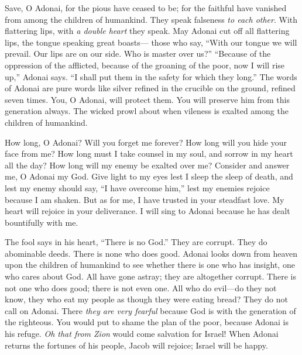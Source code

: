 \begin{biblechapter} %
 Save, O Adonai, for the pious have ceased to be; 
for the faithful have vanished 
from among the children of humankind.
\verse They speak falseness \textit{to each other}. 
With flattering lips, 
with \textit{a double heart} they speak.
\verse May Adonai cut off all flattering lips, 
the tongue speaking great boasts—
\verse those who say, “With our tongue we will prevail. 
Our lips are on our side. 
Who is master over us?”
\verse “Because of the oppression of the afflicted, 
because of the groaning of the poor, 
now I will rise up,” Adonai says. 
“I shall put them in the safety for which they long.”
\verse The words of Adonai are pure words 
like silver refined in the crucible on the ground, 
refined seven times.
\verse You, O Adonai, will protect them. 
You will preserve him 
from this generation always.
\verse The wicked prowl about 
when vileness is exalted among the children of humankind.
\end{biblechapter}

\begin{biblechapter} %
 How long, O Adonai? Will you forget me forever? 
How long will you hide your face from me?
\verse How long must I take counsel in my soul, 
and sorrow in my heart all the day? 
How long will my enemy be exalted over me?
\verse Consider and answer me, O Adonai my God. 
Give light to my eyes 
lest I sleep the sleep of death,
\verse and lest my enemy should say, “I have overcome him,” 
lest my enemies rejoice because I am shaken.
\verse But as for me, I have trusted in your steadfast love. 
My heart will rejoice in your deliverance.
\verse  I will sing to Adonai 
because he has dealt bountifully with me.
\end{biblechapter}

\begin{biblechapter} %
 The fool says in his heart, “There is no God.” 
They are corrupt. 
They do abominable deeds. 
There is none who does good.
\verse Adonai looks down from heaven upon the children of humankind 
to see whether there is one who has insight, 
one who cares about God.
\verse All have gone astray; 
they are altogether corrupt. 
There is not one who does good; 
there is not even one.
\verse All who do evil—do they not know, 
they who eat my people as though they were eating bread? 
They do not call on Adonai.
\verse There \textit{they are very fearful} 
because God is with the generation of the righteous.
\verse You would put to shame the plan of the poor, 
because Adonai is his refuge.
\verse \textit{Oh that from Zion} would come salvation for Israel! 
When Adonai returns the fortunes of his people, 
Jacob will rejoice; Israel will be happy.
\end{biblechapter}

